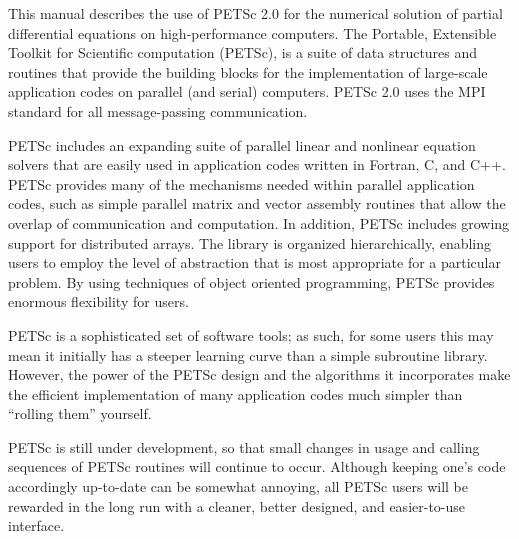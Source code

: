 

\medskip \medskip
This manual describes the use of PETSc 2.0 for the numerical solution
of partial differential equations on high-performance computers.  The
Portable, Extensible Toolkit for Scientific computation (PETSc), is a
suite of data structures and routines that provide the building
blocks for the implementation of large-scale application codes on parallel
(and serial) computers.  PETSc 2.0 uses the MPI standard for all
message-passing communication.

PETSc includes an expanding suite of parallel linear and nonlinear
equation solvers that are easily used in application codes written in
Fortran, C, and C++.  PETSc provides many of the mechanisms needed
within parallel application codes, such as simple parallel matrix and
vector assembly routines that allow the overlap of communication and
computation.  In addition, PETSc includes growing support for
distributed arrays.  The library is organized
hierarchically, enabling users to employ the level of abstraction that
is most appropriate for a particular problem. By using techniques 
of object oriented programming, PETSc provides enormous flexibility 
for users.

PETSc is a sophisticated set of software tools; as such, for some
users this may mean it initially has a steeper learning curve than a
simple subroutine library. However, the power of the PETSc design and
the algorithms it incorporates make the efficient implementation of
many application codes much simpler than ``rolling them'' yourself.

PETSc is still under development, so that small changes in usage and
calling sequences of PETSc routines will continue to occur.  Although
keeping one's code accordingly up-to-date can be somewhat annoying,
all PETSc users will be rewarded in the long run with a cleaner,
better designed, and easier-to-use interface.

